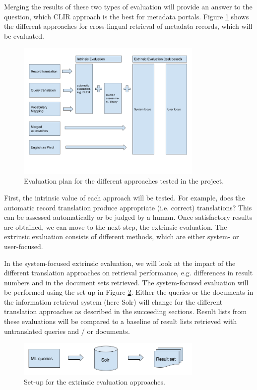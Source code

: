 \documentclass[a4paper,11pt]{article}
\begin{document}
Merging the results of these two types of evaluation will provide an answer to the question, which CLIR approach is the best for metadata portals. Figure \ref{fig1} shows the different approaches for cross-lingual retrieval of metadata records, which will be evaluated. 
\begin{figure}[h]
	\centering
  \includegraphics[width=0.8\textwidth]{./img/overview_evaluation.png}
	\caption{Evaluation plan for the different approaches tested in the project.}
	\label{fig1}
\end{figure}

First, the intrinsic value of each approach will be tested. For example, does the automatic record translation produce appropriate (i.e. correct) translations? This can be assessed automatically or be judged by a human. Once satisfactory results are obtained, we can move to the next step, the extrinsic evaluation. The extrinsic evaluation consists of different methods, which are either system- or user-focused.

In the system-focused extrinsic evaluation, we will look at the impact of the different translation approaches on retrieval performance, e.g. differences in result numbers and in the document sets retrieved. The system-focused evaluation will be performed using the set-up in Figure \ref{fig2}. Either the queries or the documents in the information retrieval system (here Solr) will change for the different translation approaches as described in the succeeding sections. Result lists from these evaluations will be compared to a baseline of result lists retrieved with untranslated queries and / or documents.

\begin{figure}[h]
	\centering
  \includegraphics[width=0.8\textwidth]{./img/Info_sys.png}
	\caption{Set-up for the extrinsic evaluation approaches.}
	\label{fig2}
\end{figure}
\end{document}
